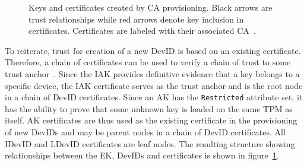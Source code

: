 \documentclass[runningheads]{llncs}
\begin{document}

\begin{figure}[hbtp]
  \centering
  
  \caption{Keys and certificates created by CA provisioning.
    Black arrows are trust relationships while red
    arrows denote key inclusion in certificates. Certificates are
    labeled with their associated CA~\citep{DevIDSpec-TCG}.}
  \label{fig:cert_rel}
\end{figure}

To reiterate, trust for creation of a new DevID is based on an existing 
certificate. Therefore, a chain of certificates can be used to verify 
a chain of trust to some trust anchor~\citep{DevIDSpec-TCG}.
Since the IAK provides definitive evidence that a key belongs to a 
specific device, the IAK certificate serves as the trust anchor 
and is the root node in a chain of DevID certificates. Since an AK has 
the \verb|Restricted| attribute set, it has the ability to prove that 
some unknown key is loaded on the same TPM as itself.  AK certificates 
are thus used as the existing certificate in the provisioning of new DevIDs
and may be parent nodes in a chain of DevID certificates. 
All IDevID and LDevID certificates are leaf nodes.
The resulting structure showing relationships between the EK, DevIDs 
and certificates is shown in figure~\ref{fig:cert_rel}.

\end{document}
